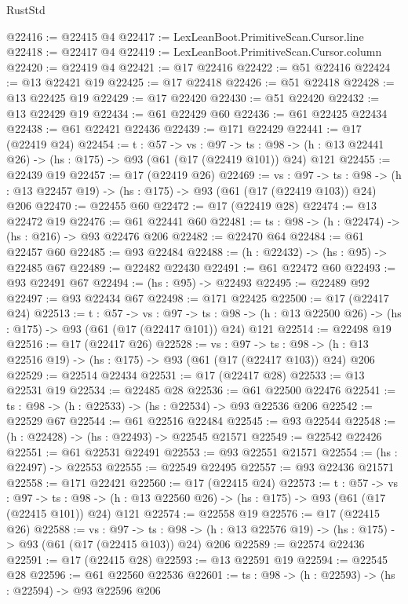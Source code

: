 \begin{lexlean}{RustStd}
\begin{coremodule}
@22416 := @22415 @4
@22417 := LexLeanBoot.PrimitiveScan.Cursor.line
@22418 := @22417 @4
@22419 := LexLeanBoot.PrimitiveScan.Cursor.column
@22420 := @22419 @4
@22421 := @17 @22416
@22422 := @51 @22416
@22424 := @13 @22421 @19
@22425 := @17 @22418
@22426 := @51 @22418
@22428 := @13 @22425 @19
@22429 := @17 @22420
@22430 := @51 @22420
@22432 := @13 @22429 @19
@22434 := @61 @22429 @60
@22436 := @61 @22425 @22434
@22438 := @61 @22421 @22436
@22439 := @171 @22429
@22441 := @17 (@22419 @24)
@22454 := {t : @57} ->
  {vs : @97} ->
  {ts : @98} -> (h : @13 @22441 @26) -> (hs : @175) -> @93 (@61 (@17 (@22419 @101)) @24) @121
@22455 := @22439 @19
@22457 := @17 (@22419 @26)
@22469 := {vs : @97} ->
  {ts : @98} -> (h : @13 @22457 @19) -> (hs : @175) -> @93 (@61 (@17 (@22419 @103)) @24) @206
@22470 := @22455 @60
@22472 := @17 (@22419 @28)
@22474 := @13 @22472 @19
@22476 := @61 @22441 @60
@22481 := {ts : @98} -> (h : @22474) -> (hs : @216) -> @93 @22476 @206
@22482 := @22470 @64
@22484 := @61 @22457 @60
@22485 := @93 @22484
@22488 := (h : @22432) -> (hs : @95) -> @22485 @67
@22489 := @22482 @22430
@22491 := @61 @22472 @60
@22493 := @93 @22491 @67
@22494 := (hs : @95) -> @22493
@22495 := @22489 @92
@22497 := @93 @22434 @67
@22498 := @171 @22425
@22500 := @17 (@22417 @24)
@22513 := {t : @57} ->
  {vs : @97} ->
  {ts : @98} -> (h : @13 @22500 @26) -> (hs : @175) -> @93 (@61 (@17 (@22417 @101)) @24) @121
@22514 := @22498 @19
@22516 := @17 (@22417 @26)
@22528 := {vs : @97} ->
  {ts : @98} -> (h : @13 @22516 @19) -> (hs : @175) -> @93 (@61 (@17 (@22417 @103)) @24) @206
@22529 := @22514 @22434
@22531 := @17 (@22417 @28)
@22533 := @13 @22531 @19
@22534 := @22485 @28
@22536 := @61 @22500 @22476
@22541 := {ts : @98} -> (h : @22533) -> (hs : @22534) -> @93 @22536 @206
@22542 := @22529 @67
@22544 := @61 @22516 @22484
@22545 := @93 @22544
@22548 := (h : @22428) -> (hs : @22493) -> @22545 @21571
@22549 := @22542 @22426
@22551 := @61 @22531 @22491
@22553 := @93 @22551 @21571
@22554 := (hs : @22497) -> @22553
@22555 := @22549 @22495
@22557 := @93 @22436 @21571
@22558 := @171 @22421
@22560 := @17 (@22415 @24)
@22573 := {t : @57} ->
  {vs : @97} ->
  {ts : @98} -> (h : @13 @22560 @26) -> (hs : @175) -> @93 (@61 (@17 (@22415 @101)) @24) @121
@22574 := @22558 @19
@22576 := @17 (@22415 @26)
@22588 := {vs : @97} ->
  {ts : @98} -> (h : @13 @22576 @19) -> (hs : @175) -> @93 (@61 (@17 (@22415 @103)) @24) @206
@22589 := @22574 @22436
@22591 := @17 (@22415 @28)
@22593 := @13 @22591 @19
@22594 := @22545 @28
@22596 := @61 @22560 @22536
@22601 := {ts : @98} -> (h : @22593) -> (hs : @22594) -> @93 @22596 @206

\end{coremodule}
\end{lexlean}
